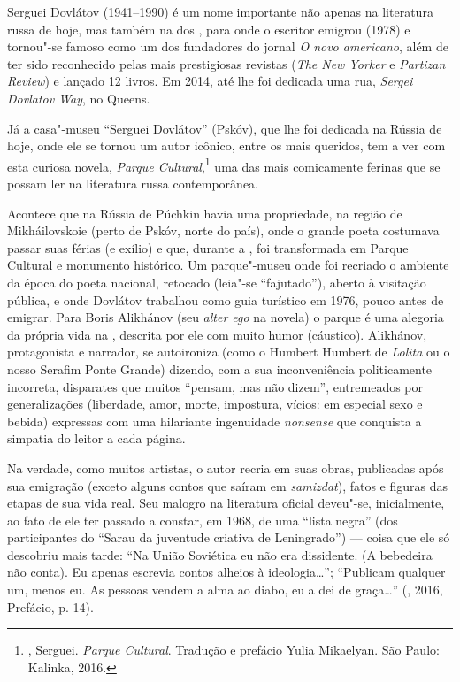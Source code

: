Serguei Dovlátov (1941--1990) é um nome importante não apenas na
literatura russa de hoje, mas também na dos , para onde o escritor
emigrou (1978) e tornou"-se famoso como um dos fundadores do jornal \emph{O novo
americano}, além de ter sido reconhecido pelas mais prestigiosas revistas (\emph{The New
Yorker} e \emph{Partizan Review}) e lançado 12 livros. Em 2014, até lhe foi dedicada
uma rua, \emph{Sergei Dovlatov Way}, no Queens.

Já a casa"-museu ``Serguei Dovlátov'' (Pskóv), que lhe foi dedicada na Rússia de
hoje, onde ele se tornou um autor icônico, entre os mais queridos, tem a
ver com esta curiosa novela, \emph{Parque 
Cultural},\footnote{, Serguei. \emph{Parque Cultural}.
 Tradução e prefácio Yulia Mikaelyan. São Paulo: Kalinka, 2016.} uma das mais comicamente ferinas que se
possam ler na literatura russa contemporânea. 

Acontece que na Rússia de Púchkin havia uma propriedade, na região de Mikháilovskoie (perto de
Pskóv, norte do país), onde o grande poeta costumava passar suas
férias (e exílio) e que, durante a , foi transformada em
Parque Cultural e monumento histórico. Um parque"-museu onde foi
recriado o ambiente da época do poeta nacional, retocado (leia"-se
``fajutado''), aberto à visitação pública, e onde Dovlátov trabalhou
como guia turístico em 1976, pouco antes de emigrar.
Para Boris Alikhánov (seu \emph{alter ego} na novela) o parque é uma alegoria da própria
vida na , descrita por ele com muito humor (cáustico). 
Alikhánov, protagonista e narrador, se autoironiza (como o Humbert Humbert de
\emph{Lolita} ou o nosso Serafim Ponte Grande) dizendo, com a sua
inconveniência politicamente incorreta, disparates que muitos ``pensam,
mas não dizem'', entremeados por generalizações
(liberdade, amor, morte, impostura, vícios: em especial sexo e
bebida) expressas com uma hilariante ingenuidade \emph{nonsense} que
conquista a simpatia do leitor a cada página.

Na verdade, como muitos artistas, o autor recria em suas obras, publicadas
após sua emigração (exceto alguns contos que saíram em \emph{samizdat}), fatos e figuras das etapas de sua vida
real. Seu malogro na literatura oficial deveu"-se, inicialmente, ao fato de ele
ter passado a constar, em 1968, de uma ``lista negra'' (dos
participantes do ``Sarau da juventude criativa de Leningrado'') --- coisa
que ele só descobriu mais tarde: ``Na União Soviética eu não era
dissidente. (A bebedeira não conta). Eu apenas escrevia contos alheios à
ideologia\ldots{}''; ``Publicam qualquer um, menos eu. As pessoas vendem a alma ao
diabo, eu a dei de graça\ldots{}'' (, 2016, Prefácio, p. 14).

